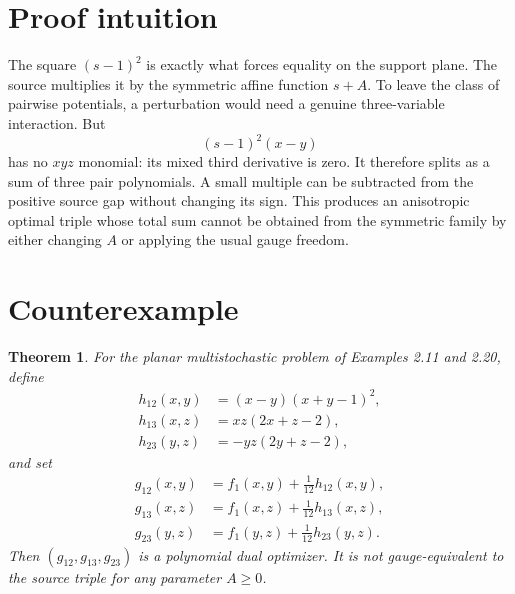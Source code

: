 \documentclass[11pt]{article}
\newtheorem{theorem}{Theorem}
\begin{document}
\section{Proof intuition}

The square $(s-1)^2$ is exactly what forces equality on the support plane.
The source multiplies it by the symmetric affine function $s+A$. To leave the
class of pairwise potentials, a perturbation would need a genuine
three-variable interaction. But
\[
 (s-1)^2(x-y)
\]
has no $xyz$ monomial: its mixed third derivative is zero. It therefore splits
as a sum of three pair polynomials. A small multiple can be subtracted from
the positive source gap without changing its sign. This produces an
anisotropic optimal triple whose total sum cannot be obtained from the
symmetric family by either changing $A$ or applying the usual gauge freedom.

\section{Counterexample}

\begin{theorem}
For the planar multistochastic problem of Examples 2.11 and 2.20, define
\begin{align*}
 h_{12}(x,y)&=(x-y)(x+y-1)^2,\\
 h_{13}(x,z)&=xz(2x+z-2),\\
 h_{23}(y,z)&=-yz(2y+z-2),
\end{align*}
and set
\begin{align*}
 g_{12}(x,y)&=f_1(x,y)+\frac1{12}h_{12}(x,y),\\
 g_{13}(x,z)&=f_1(x,z)+\frac1{12}h_{13}(x,z),\\
 g_{23}(y,z)&=f_1(y,z)+\frac1{12}h_{23}(y,z).
\end{align*}
Then $(g_{12},g_{13},g_{23})$ is a polynomial dual optimizer. It is not
gauge-equivalent to the source triple for any parameter $A\geq0$.
\end{theorem}
\end{document}
